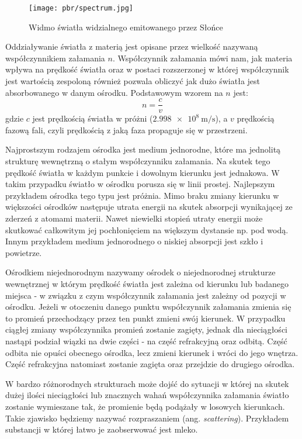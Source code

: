 \documentclass[../main.tex]{subfiles}
\begin{document}
\begin{figure}[ht]
  \centering
  \texttt{[image: pbr/spectrum.jpg]}
  \caption{Widmo światła widzialnego emitowanego przez Słońce}
\end{figure}

Oddziaływanie światła z materią jest opisane przez wielkość nazywaną współczynnikiem załamania $n$. Współczynnik załamania mówi nam, jak materia wpływa na prędkość światła oraz w postaci rozszerzonej w której współczynnik jest wartością zespoloną również pozwala obliczyć jak dużo światła jest absorbowanego w danym ośrodku. Podstawowym wzorem na $n$ jest:
\[
    n = \frac{c}{v}
\]
gdzie $c$ jest prędkością światła w próżni ($\SI{2.998e8}{\meter\per\second}$), a $v$ prędkością fazową fali, czyli prędkością z jaką faza propaguje się w przestrzeni.

Najprostszym rodzajem ośrodka jest medium jednorodne, które ma jednolitą strukturę wewnętrzną o stałym współczynniku załamania. Na skutek tego prędkość światła w każdym punkcie i dowolnym kierunku jest jednakowa. W takim przypadku światło w ośrodku porusza się w linii prostej. Najlepszym przykładem ośrodka tego typu jest próżnia. Mimo braku zmiany kierunku w większości ośrodków następuje utrata energii na skutek absorpcji wynikającej ze zderzeń z atomami materii. Nawet niewielki stopień utraty energii może skutkować całkowitym jej pochłonięciem na większym dystansie np. pod wodą. Innym przykładem medium jednorodnego o niskiej absorpcji jest szkło i powietrze.

Ośrodkiem niejednorodnym nazywamy ośrodek o niejednorodnej strukturze wewnętrznej w którym prędkość światła jest zależna od kierunku lub badanego miejsca - w związku z czym współczynnik załamania jest zależny od pozycji w ośrodku. Jeżeli w otoczeniu danego punktu współczynnik załamania zmienia się to promień przechodzący przez ten punkt zmieni swój kierunek. W przypadku ciągłej zmiany współczynnika promień zostanie zagięty, jednak dla nieciągłości nastąpi podział wiązki na dwie części - na część refrakcyjną oraz odbitą. Część odbita nie opuści obecnego ośrodka, lecz zmieni kierunek i wróci do jego wnętrza. Część refrakcyjna natomiast zostanie zagięta oraz przejdzie do drugiego ośrodka. 

W bardzo różnorodnych strukturach może dojść do sytuacji w której na skutek dużej ilości nieciągłości lub znacznych wahań współczynnika załamania światło  zostanie wymieszane tak, że promienie będą podążały w losowych kierunkach. Takie zjawisko będziemy nazywać rozpraszaniem (ang. \textit{scattering}). Przykładem substancji w której łatwo je zaobserwować jest mleko.
\end{document}
